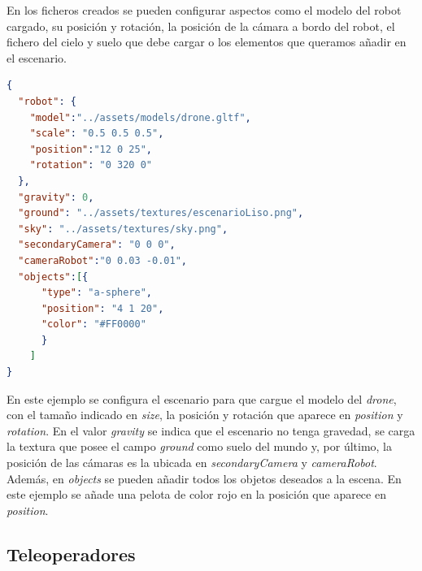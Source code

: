 En los ficheros creados se pueden configurar aspectos como el modelo del robot cargado, su posición y rotación, la posición de la cámara a bordo del robot, el fichero del cielo y suelo que debe cargar o los elementos que queramos añadir en el escenario. \newline

\begin{lstlisting}[language=json, caption=Ejemplo de fichero de configuración]
  {
  "robot": {
    "model":"../assets/models/drone.gltf",
    "scale": "0.5 0.5 0.5",
    "position":"12 0 25",
    "rotation": "0 320 0"
  },
  "gravity": 0,
  "ground": "../assets/textures/escenarioLiso.png",
  "sky": "../assets/textures/sky.png",
  "secondaryCamera": "0 0 0",
  "cameraRobot":"0 0.03 -0.01",
  "objects":[{
      "type": "a-sphere",
      "position": "4 1 20",
      "color": "#FF0000"
      }
    ]
}
\end{lstlisting}

En este ejemplo se configura el escenario para que cargue el modelo del \textit{drone}, con el tamaño indicado en \textit{size}, la posición y rotación que aparece en \textit{position} y \textit{rotation}. En el valor \textit{gravity} se indica que el escenario no tenga gravedad, se carga la textura que posee el campo \textit{ground} como suelo del mundo y, por último, la posición de las cámaras es la ubicada en \textit{secondaryCamera} y \textit{cameraRobot}. Además, en \textit{objects} se pueden añadir todos los objetos deseados a la escena. En este ejemplo se añade una pelota de color rojo en la posición que aparece en \textit{position}.

\subsection{Teleoperadores}

